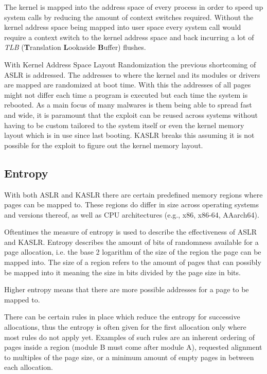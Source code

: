 The kernel is mapped into the address space of every process in order to speed up system calls by reducing the amount of context switches required.
Without the kernel address space being mapped into user space every system call would require a context switch to the kernel address space and back incurring a lot of \textit{TLB} (\textbf{T}ranslation \textbf{L}ookaside \textbf{B}uffer) flushes.\cite{kaiser_lwn}

With Kernel Address Space Layout Randomization the previous shortcoming of ASLR is addressed.
The addresses to where the kernel and its modules or drivers are mapped are randomized at boot time.
With this the addresses of all pages might not differ each time a program is executed but each time the system is rebooted.\cite{kaslr_lwn}
As a main focus of many malwares is them being able to spread fast and wide, it is paramount that the exploit can be reused across systems without having to be custom tailored to the system itself or even the kernel memory layout which is in use since last booting.
KASLR breaks this assuming it is not possible for the exploit to figure out the kernel memory layout.

\subsection{Entropy}

With both ASLR and KASLR there are certain predefined memory regions where pages can be mapped to.
These regions do differ in size across operating systems and versions thereof, as well as CPU architectures (e.g., x86, x86-64, AAarch64).\cite{drk}

Oftentimes the measure of entropy is used to describe the effectiveness of ASLR and KASLR.
Entropy describes the amount of bits of randomness available for a page allocation, i.e. the base 2 logarithm of the size of the region the page can be mapped into.
The size of a region refers to the amount of pages that can possibly be mapped into it meaning the size in bits divided by the page size in bits.

Higher entropy means that there are more possible addresses for a page to be mapped to.

There can be certain rules in place which reduce the entropy for successive allocations,  thus the entropy is often given for the first allocation only where most rules do not apply yet.
Examples of such rules are an inherent ordering of pages inside a region (module B must come after module A), requested alignment to multiples of the page size, or a minimum amount of empty pages in between each allocation.

